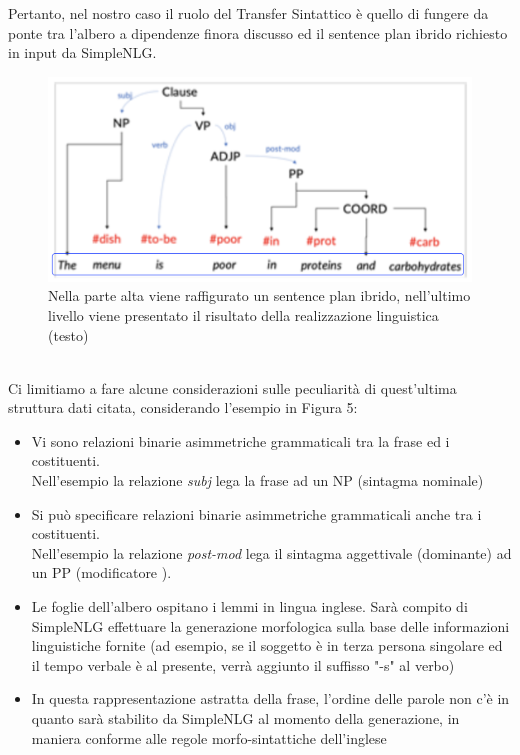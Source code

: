 Pertanto, nel nostro caso il ruolo del Transfer Sintattico è quello di fungere da ponte tra l'albero a dipendenze finora discusso ed il sentence plan ibrido richiesto in input da SimpleNLG.
\begin{figure}[ht]
	\centering 
	\includegraphics[width=1\linewidth]{./img/sentence_plan}
	\caption{Nella parte alta viene raffigurato un sentence plan ibrido, nell'ultimo livello viene presentato il risultato della realizzazione linguistica (testo)}
	\label{sentence_plan}
\end{figure} \\
Ci limitiamo a fare alcune considerazioni sulle peculiarità di quest'ultima struttura dati citata, considerando l'esempio in Figura 5:
\begin{itemize}
	\item Vi sono relazioni binarie asimmetriche grammaticali tra la frase ed i costituenti. \\Nell'esempio la relazione \textit{subj} lega la frase ad un NP (sintagma nominale)
	\item Si può specificare relazioni binarie asimmetriche grammaticali anche tra i costituenti. \\Nell'esempio la relazione \textit{post-mod} lega il sintagma aggettivale (dominante) ad un PP (modificatore ).	
	\item Le foglie dell'albero ospitano i lemmi in lingua inglese. Sarà compito di SimpleNLG effettuare la generazione morfologica sulla base delle informazioni linguistiche fornite (ad esempio, se il soggetto è in terza persona singolare ed il tempo verbale è al presente, verrà aggiunto il suffisso "-s" al verbo)
	\item In questa rappresentazione astratta della frase, l'ordine delle parole non c'è in quanto sarà stabilito da SimpleNLG al momento della generazione, in maniera conforme alle regole morfo-sintattiche dell'inglese
\end{itemize}
